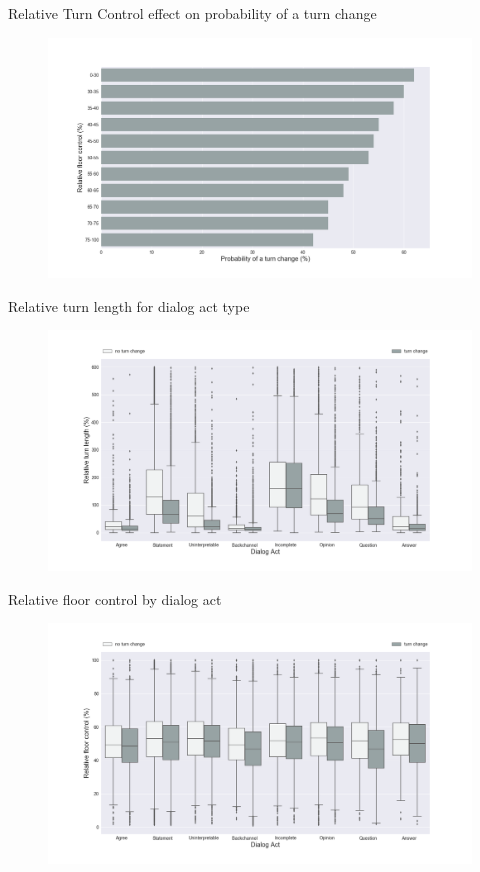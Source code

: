 \begin{frame}{Relative Turn Control effect on probability of a turn change}
\begin{figure}[ht!]
\centering
\includegraphics[width=36em]{../scikitlearn/figures/f6.png}\vspace{-1em}
\end{figure}
\end{frame}

\begin{frame}{Relative turn length for dialog act type}
\begin{figure}[ht!]
\centering
\includegraphics[width=36em]{../scikitlearn/figures/f3.png}\vspace{-1em}
\end{figure}
\end{frame}


\begin{frame}{Relative floor control by dialog act}
\begin{figure}[ht!]
\centering
\includegraphics[width=36em]{../scikitlearn/figures/f4.png}\vspace{-1em}
\end{figure}
\end{frame}
